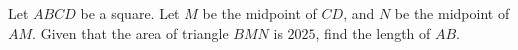 Let $ABCD$ be a square. Let $M$ be the midpoint of $CD$, and $N$ be the midpoint of $AM$. Given that the area of triangle $BMN$ is $2025$, find the length of $AB$.
